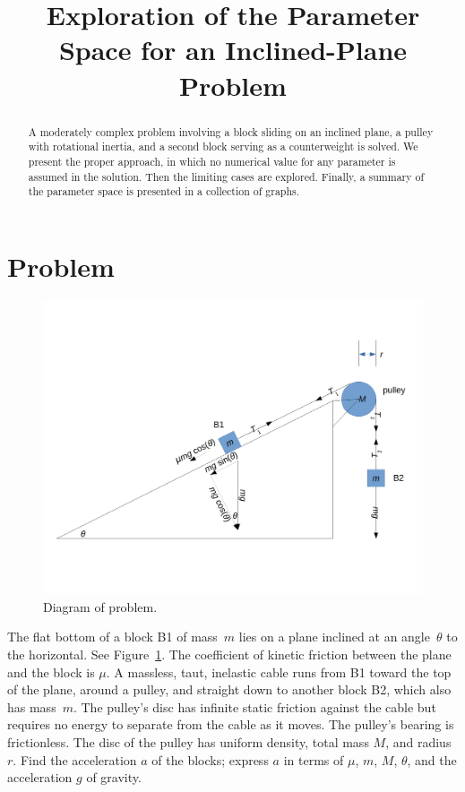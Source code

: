 \documentclass[twocolumn]{article}
\title{Exploration of the Parameter Space for an Inclined-Plane Problem}
\begin{document}
\maketitle

\begin{abstract}
   A moderately complex problem involving a block sliding on an inclined plane,
   a pulley with rotational inertia, and a second block serving as a
   counterweight is solved. We present the proper approach, in which no
   numerical value for any parameter is assumed in the solution. Then the
   limiting cases are explored. Finally, a summary of the parameter space is
   presented in a collection of graphs.
\end{abstract}

\section{Problem}

\begin{figure}
   \includegraphics[width=\textwidth]{diagram}
   \caption{Diagram of problem.}
   \label{fig:diagram}
\end{figure}

The flat bottom of a block B1 of mass~$m$ lies on a plane inclined at an
angle~$\theta$ to the horizontal. See Figure~\ref{fig:diagram}. The coefficient
of kinetic friction between the plane and the block is $\mu$.  A massless,
taut, inelastic cable runs from B1 toward the top of the plane, around a
pulley, and straight down to another block B2, which also has mass~$m$.  The
pulley's disc has infinite static friction against the cable but requires no
energy to separate from the cable as it moves. The pulley's bearing is
frictionless. The disc of the pulley has uniform density, total mass $M$, and
radius $r$. Find the acceleration $a$ of the blocks; express $a$ in terms of
$\mu$, $m$, $M$, $\theta$, and the acceleration $g$ of gravity.
\end{document}
